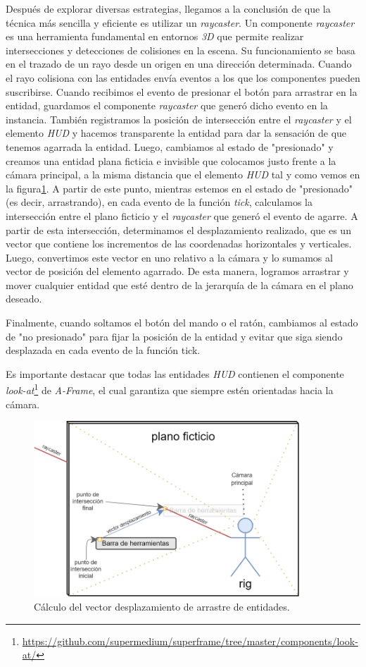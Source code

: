 \documentclass[a4paper, 11pt]{book}
\begin{document}
Después de explorar diversas estrategias, llegamos a la conclusión de que la técnica más sencilla y eficiente es utilizar un \emph{raycaster}. Un componente \emph{raycaster} es una herramienta fundamental en entornos \emph{3D} que permite realizar intersecciones y detecciones de colisiones en la escena. Su funcionamiento se basa en el trazado de un rayo desde un origen en una dirección determinada. Cuando el rayo colisiona con las entidades envía eventos a los que los componentes pueden suscribirse. Cuando recibimos el evento de presionar el botón para arrastrar en la entidad, guardamos el componente \emph{raycaster} que generó dicho evento en la instancia. 
También registramos la posición de intersección entre el \emph{raycaster} y el elemento \emph{HUD} y hacemos transparente la entidad para dar la sensación de que tenemos agarrada la entidad. Luego, cambiamos al estado de "presionado" y creamos una entidad plana ficticia e invisible que colocamos justo frente a la cámara principal, a la misma distancia que el elemento \emph{HUD} tal y como vemos en la figura\ref{fig:raycaster}. A partir de este punto, mientras estemos en el estado de "presionado" (es decir, arrastrando), en cada evento de la función \emph{tick}, calculamos la intersección entre el plano ficticio y el \emph{raycaster} que generó el evento de agarre. A partir de esta intersección, determinamos el desplazamiento realizado, que es un vector que contiene los incrementos de las coordenadas horizontales y verticales. Luego, convertimos este vector en uno relativo a la cámara y lo sumamos al vector de posición del elemento agarrado. De esta manera, logramos arrastrar y mover cualquier entidad que esté dentro de la jerarquía de la cámara en el plano deseado.

Finalmente, cuando soltamos el botón del mando o el ratón, cambiamos al estado de "no presionado" para fijar la posición de la entidad y evitar que siga siendo desplazada en cada evento de la función tick.

Es importante destacar que todas las entidades \emph{HUD} contienen el componente \emph{look-at}\footnote{\url{https://github.com/supermedium/superframe/tree/master/components/look-at/}} de \emph{A-Frame}, el cual garantiza que siempre estén orientadas hacia la cámara.

\begin{figure}[H]
  \centering
  \includegraphics[width=10cm, keepaspectratio]{img/custom-draggable.png}
  \caption{Cálculo del vector desplazamiento de arrastre de entidades.}
  \label{fig:raycaster}
\end{figure}
\end{document}
